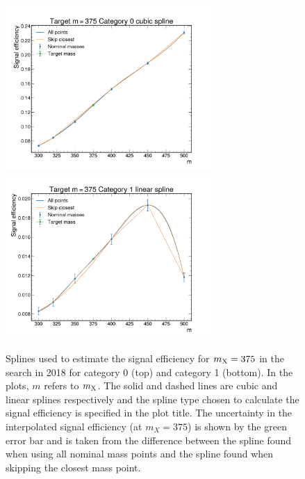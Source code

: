 \begin{figure}
  \centering
  \includegraphics[width=0.7\textwidth]{Figures/Dihiggs/signal/sigeff_interpolation/graviton_375_2018_cat0_interpolation.pdf} \\
  \includegraphics[width=0.7\textwidth]{Figures/Dihiggs/signal/sigeff_interpolation/graviton_375_2018_cat1_interpolation.pdf}
  \caption[Signal Efficiency Splines for $\mX=375$\GeV in the \XTwoHH Search]{Splines used to estimate the signal efficiency for $\mX=375$ in the \XTwoHH search in 2018 for category 0 (top) and category 1 (bottom). In the plots, $m$ refers to $m_{\mathrm{X}}$. The solid and dashed lines are cubic and linear splines respectively and the spline type chosen to calculate the signal efficiency is specified in the plot title. The uncertainty in the interpolated signal efficiency (at $m_X=375$) is shown by the green error bar and is taken from the difference between the spline found when using all nominal mass points and the spline found when skipping the closest mass point.}\label{fig:graviton_example_splines1}
\end{figure}

